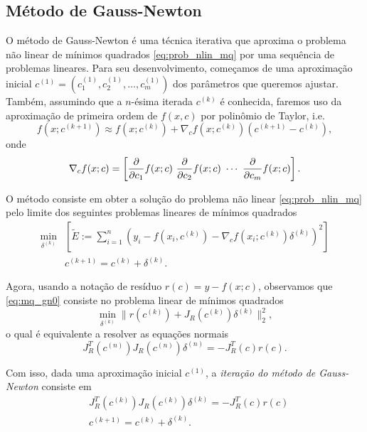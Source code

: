 \subsection{Método de Gauss-Newton}

O método de Gauss-Newton é uma técnica iterativa que aproxima o problema não linear de mínimos quadrados \eqref{eq:prob_nlin_mq} por uma sequência de problemas lineares. Para seu desenvolvimento, começamos de uma aproximação inicial $c^{(1)} = (c_1^{(1)}, c_2^{(1)}, \dotsc, c_m^{(1)})$ dos parâmetros que queremos ajustar. Também, assumindo que a $n$-ésima iterada $c^{(k)}$ é conhecida, faremos uso da aproximação de primeira ordem de $f(x,c)$ por polinômio de Taylor, i.e.
\begin{equation}
  f(x;c^{(k+1)}) \approx f(x;c^{(k)}) + \nabla_c f(x;c^{(k)})(c^{(k+1)}-c^{(k)}),
\end{equation}
onde
\begin{equation}
  \nabla_c f(x;c) = \left[\frac{\partial}{\partial c_1}f(x;c) ~\frac{\partial}{\partial c_2}f(x;c) ~\cdots ~\frac{\partial}{\partial c_m}f(x;c)\right].
\end{equation}

O método consiste em obter a solução do problema não linear \eqref{eq:prob_nlin_mq} pelo limite dos seguintes problemas lineares de mínimos quadrados
\begin{align}
  \min_{\delta^{(k)}} &\left[\tilde{E} := \sum_{i=1}^n (y_i - f(x_i,c^{(k)}) - \nabla_c f(x_i;c^{(k)})\delta^{(k)})^2\right] \label{eq:mq_gn0}\\
  &c^{(k+1)} = c^{(k)} + \delta^{(k)}.
\end{align}

Agora, usando a notação de resíduo $r(c) = y - f(x;c)$, observamos que \eqref{eq:mq_gn0} consiste no problema linear de mínimos quadrados
\begin{equation}
  \min_{\delta^{(k)}} \|r(c^{(k)}) + J_R(c^{(k)})\delta^{(k)}\|_2^2,
\end{equation}
o qual é equivalente a resolver as equações normais
\begin{equation}
  J_R^T(c^{(n)})J_R(c^{(n)})\delta^{(n)} = -J_R^T(c)r(c).
\end{equation}

Com isso, dada uma aproximação inicial $c^{(1)}$, a \emph{iteração do método de Gauss-Newton} consiste em
\begin{align}
  &J_R^T(c^{(k)})J_R(c^{(k)})\delta^{(k)} = -J_R^T(c)r(c)\\
  &c^{(k+1)} = c^{(k)} + \delta^{(k)}.
\end{align}

